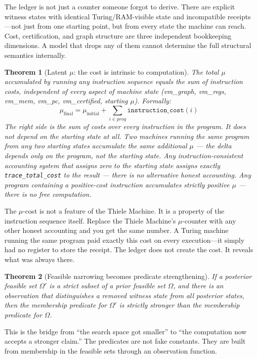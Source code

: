 \documentclass[11pt,a4paper]{article}
\theoremstyle{plain}
\newtheorem{theorem}{Theorem}[section]
\theoremstyle{definition}
\theoremstyle{remark}
\begin{document}
The ledger is not just a counter someone forgot to derive. There are explicit witness states with identical Turing/RAM-visible state and incompatible receipts---not just from one starting point, but from every state the machine can reach. Cost, certification, and graph structure are three independent bookkeeping dimensions. A model that drops any of them cannot determine the full structural semantics internally.

\begin{theorem}[Latent $\mu$: the cost is intrinsic to computation]
\label{thm:latent_mu}
The total $\mu$ accumulated by running any instruction sequence equals the sum of instruction costs, independent of every aspect of machine state (vm\_graph, vm\_regs, vm\_mem, vm\_pc, vm\_certified, starting $\mu$). Formally:
\[
\mu_{\text{final}} = \mu_{\text{initial}} + \textstyle\sum_{i \in \textit{prog}} \texttt{instruction\_cost}(i)
\]
The right side is the sum of costs over every instruction in the program. It does not depend on the starting state at all.
Two machines running the same program from any two starting states accumulate the same additional $\mu$ --- the delta depends only on the program, not the starting state. Any instruction-consistent accounting system that assigns zero to the starting state assigns exactly \texttt{trace\_total\_cost} to the result --- there is no alternative honest accounting. Any program containing a positive-cost instruction accumulates strictly positive $\mu$ --- there is no free computation.
\end{theorem}

The $\mu$-cost is not a feature of the Thiele Machine. It is a property of the instruction sequence itself. Replace the Thiele Machine's $\mu$-counter with any other honest accounting and you get the same number. A Turing machine running the same program paid exactly this cost on every execution---it simply had no register to store the receipt. The ledger does not create the cost. It reveals what was always there.

\begin{theorem}[Feasible narrowing becomes predicate strengthening]
If a posterior feasible set $\Omega'$ is a strict subset of a prior feasible set $\Omega$, and there is an observation that distinguishes a removed witness state from all posterior states, then the membership predicate for $\Omega'$ is strictly stronger than the membership predicate for $\Omega$.
\end{theorem}

This is the bridge from ``the search space got smaller'' to ``the computation now accepts a stronger claim.'' The predicates are not fake constants. They are built from membership in the feasible sets through an observation function.
\end{document}
